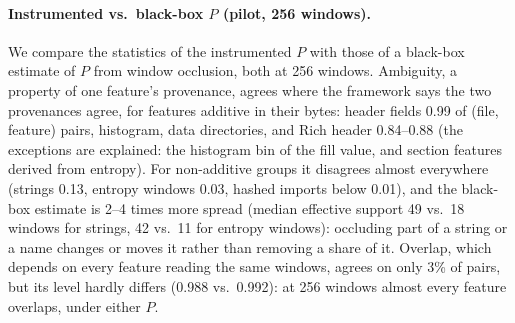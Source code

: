 \paragraph{Instrumented vs.\ black-box $P$ (pilot, 256 windows).} We compare the statistics of the instrumented $P$ with those of a black-box estimate of $P$ from window occlusion, both at 256 windows. Ambiguity, a property of one feature's provenance, agrees where the framework says the two provenances agree, for features additive in their bytes: header fields 0.99 of (file, feature) pairs, histogram, data directories, and Rich header 0.84--0.88 (the exceptions are explained: the histogram bin of the fill value, and section features derived from entropy). For non-additive groups it disagrees almost everywhere (strings 0.13, entropy windows 0.03, hashed imports below 0.01), and the black-box estimate is 2--4 times more spread (median effective support 49 vs.\ 18 windows for strings, 42 vs.\ 11 for entropy windows): occluding part of a string or a name changes or moves it rather than removing a share of it. Overlap, which depends on every feature reading the same windows, agrees on only 3\% of pairs, but its level hardly differs (0.988 vs.\ 0.992): at 256 windows almost every feature overlaps, under either $P$.



